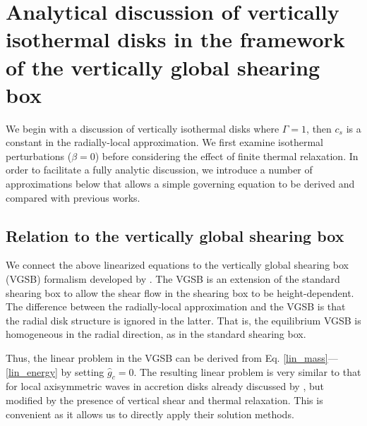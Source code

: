 \section{Analytical discussion of vertically isothermal
  disks in the framework of the vertically global shearing
  box}\label{analytical}  
We begin with a discussion of vertically isothermal disks
where $\Gamma=1$, then $c_s$ is a constant in the radially-local
approximation. We  first examine isothermal perturbations ($\beta =
0$) before considering the effect of finite thermal relaxation. 
In order to facilitate a fully analytic discussion, we introduce a
number of approximations below that allows a simple governing equation
to be derived and compared with previous works.  

\subsection{Relation to the vertically global
  shearing box} 
We connect the above linearized equations to the vertically global
shearing box (VGSB) formalism developed by \cite{mcnally14}. The VGSB
is an extension of the standard shearing box \citep{goldreich65} to
allow the shear flow in the shearing box to be height-dependent.  
The difference between the radially-local approximation and the VGSB is
that the radial disk structure is ignored in the latter.  That is, the
equilibrium VGSB is homogeneous in the radial direction, as in the
standard shearing box. 


Thus, the linear problem in the VGSB can be derived from
Eq. \ref{lin_mass}---\ref{lin_energy} by setting 
$\hat{g}_c=0$.  
The resulting linear problem is very similar
to that for local axisymmetric waves in accretion disks already
discussed by \cite{lubow93}, but modified by the presence of vertical
shear and thermal relaxation. This is convenient as it allows us to
directly apply their solution methods.    


